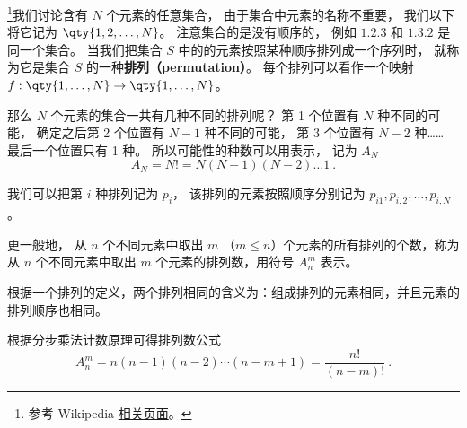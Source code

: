 
\begin{issues}
\end{issues}




\footnote{参考 Wikipedia \href{https://en.wikipedia.org/wiki/Permutation}{相关页面}。}我们讨论含有 $N$ 个元素的任意集合， 由于集合中元素的名称不重要， 我们以下将它记为 $\qty{1,2,\dots, N}$。 注意集合的是没有顺序的， 例如 $\qty{1,2,3}$ 和 $\qty{1,3,2}$ 是同一个集合。 当我们把集合 $S$ 中的的元素按照某种顺序排列成一个序列时， 就称为它是集合 $S$ 的一种\textbf{排列（permutation）}。 每个排列可以看作一个映射 $f:\qty{1,\dots,N}\to\qty{1,\dots,N}$。

那么 $N$ 个元素的集合一共有几种不同的排列呢？ 第 1 个位置有 $N$ 种不同的可能， 确定之后第 2 个位置有 $N-1$ 种不同的可能， 第 3 个位置有 $N-2$ 种…… 最后一个位置只有 1 种。 所以可能性的种数可以用表示， 记为 $A_N$
\begin{equation}
A_N = N! = N(N-1)(N-2)\dots 1~.
\end{equation}

我们可以把第 $i$ 种排列记为 $p_i$， 该排列的元素按照顺序分别记为 $p_{i1}, p_{i,2}, \dots, p_{i,N}$。

更一般地， 从 $n$ 个不同元素中取出 $m$ （$m \leq n$）个元素的所有排列的个数，称为从 $n$ 个不同元素中取出 $m$ 个元素的排列数，用符号 $A_n^m$ 表示。

根据一个排列的定义，两个排列相同的含义为：组成排列的元素相同，并且元素的排列顺序也相同。

根据分步乘法计数原理可得排列数公式
\begin{equation}\label{eq_permut_1}
A_n^m = n (n - 1)(n - 2) \cdots (n - m + 1) =\frac{n!}{(n - m)!}~.
\end{equation}

